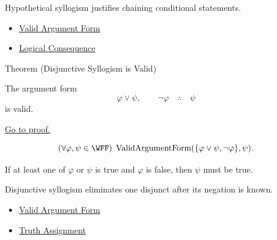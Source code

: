 \begin{remark*}[Interpretation]
Hypothetical syllogism justifies chaining conditional statements.
\end{remark*}

\begin{dependencies}
\begin{itemize}
  \item \hyperref[def:valid-argument-form-propositional-logic]{Valid Argument Form}
  \item \hyperref[def:logical-consequence-propositional-logic]{Logical Consequence}
\end{itemize}
\end{dependencies}

\begin{theorembox}{Theorem (Disjunctive Syllogism is Valid)}
\begin{theorem}
\label{thm:disjunctive-syllogism-validity-propositional-logic}
The argument form
\[
\varphi\lor\psi,\qquad \neg\varphi \quad\therefore\quad \psi
\]
is valid.

\noindent\hyperref[prf:disjunctive-syllogism-validity-propositional-logic]{Go to proof.}
\end{theorem}
\end{theorembox}

\begin{remark*}
\[
(\forall\varphi,\psi\in\WFF)\;\operatorname{ValidArgumentForm}(\{\varphi\lor\psi,\neg\varphi\},\psi).
\]
\end{remark*}

\begin{remark*}
If at least one of \(\varphi\) or \(\psi\) is true and \(\varphi\) is false, then \(\psi\) must be true.
\end{remark*}

\begin{remark*}[Interpretation]
Disjunctive syllogism eliminates one disjunct after its negation is known.
\end{remark*}

\begin{dependencies}
\begin{itemize}
  \item \hyperref[def:valid-argument-form-propositional-logic]{Valid Argument Form}
  \item \hyperref[def:truth-assignment-propositional-logic]{Truth Assignment}
\end{itemize}
\end{dependencies}

